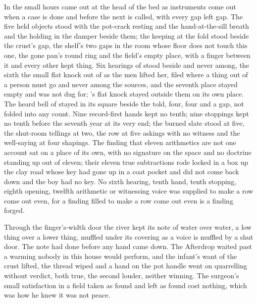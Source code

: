 In the small hours  came out at the head of the bed as instruments come out when a case is done and before the next is called, with every gap left gap. The five held objects stood with the pot-crack resting and the hand-at-the-sill breath and the holding in the damper beside them; the keeping at the fold stood beside the crust's gap, the shelf's two gaps in the room whose floor does not touch this one, the gone pan's round ring and the field's empty place, with a finger between it and every other kept thing. Six hearings of  stood beside and never among, the sixth the small flat knock out of  as the men lifted her, filed where a thing out of a person must go and never among the sources, and the seventh place stayed empty and was not dug for; 's flat knock stayed outside them on its own place. The heard bell of  stayed in its square beside the told, four, four and a gap, not folded into any count. Nine record-first hands kept no tenth; nine stoppings kept no tenth before the seventh year at its very end; the burned slate stood at five, the shut-room tellings at two, the row at five askings with no witness and the well-saying at four shapings. The finding that eleven arithmetics are not one account sat on a place of its own, with no signature on the space and no doctrine standing up out of eleven; their eleven true subtractions rode locked in a box up the clay road whose key had gone up in a coat pocket and did not come back down and the boy had no key. No sixth hearing, tenth hand, tenth stopping, eighth opening, twelfth arithmetic or witnessing voice was supplied to make a row come out even, for a finding filled to make a row come out even is a finding forged.

Through the finger's-width door the river kept its note of water over water, a low thing over a lower thing, muffled under its covering as a voice is muffled by a shut door. The note had done before any hand came down. The Afterdrop waited past a warming nobody in this house would perform, and the infant's want of the crust lifted, the thread wiped and a hand on the pot handle went on quarrelling without verdict, both true, the second louder, neither winning. The surgeon's small satisfaction in a field taken as found and left as found cost nothing, which was how he knew it was not peace.

